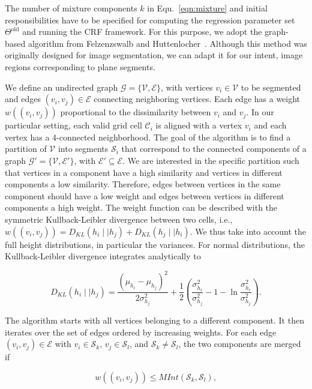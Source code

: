 The number of mixture components $k$ in Equ.~\eqref{eqn:mixture} and initial
responsibilities have to be specified for computing the regression parameter set
$\Theta^\text{old}$ and running the CRF framework. For this purpose, we adopt
the graph-based algorithm from Felzenzswalb and
Huttenlocher~\cite{felzenszwalb04efficient}. Although this method was originally
designed for image segmentation, we can adapt it for our intent, image regions
corresponding to plane segments.

We define an undirected graph $\mathcal{G}=\{\mathcal{V},\mathcal{E}\}$, with
vertices $v_i\in\mathcal{V}$ to be segmented and edges $(v_i,v_j)\in\mathcal{E}$
connecting neighboring vertices. Each edge has a weight $w((v_i,v_j))$
proportional to the dissimilarity between $v_i$ and $v_j$. In our particular
setting, each valid grid cell $\mathcal{C}_i$ is aligned with a vertex $v_i$ and
each vertex has a 4-connected neighborhood. The goal of the algorithm is to find
a partition of $\mathcal{V}$ into segments $\mathcal{S}_i$ that correspond to
the connected components of a graph $\mathcal{G}'=\{\mathcal{V},\mathcal{E}'\}$,
with $\mathcal{E}'\subseteq\mathcal{E}$. We are interested in the specific
partition such that vertices in a component have a high similarity and vertices
in different components a low similarity. Therefore, edges between vertices in
the same component should have a low weight and edges between vertices in
different components a high weight. The weight function can be described with
the symmetric Kullback-Leibler divergence between two cells, i.e.,
$w((v_i,v_j))=D_{KL}(h_i\mid\mid h_j)+D_{KL}(h_j\mid\mid h_i)$. We thus take
into account the full height distributions, in particular the variances. For
normal distributions, the Kullback-Leibler divergence integrates analytically to

\begin{equation}
\label{eqn:kl}
D_{KL}(h_i\mid\mid h_j)=\frac{(\mu_{h_i}-\mu_{h_j})^2}{2\sigma_{h_j}^2}+
\frac{1}{2}(\frac{\sigma_{h_i}^2}{\sigma_{h_j}^2}-1-\ln\frac{\sigma_{h_i}^2}
{\sigma_{h_j}^2}).
\end{equation}

The algorithm starts with all vertices belonging to a different component. It
then iterates over the set of edges ordered by increasing weights. For each
edge $(v_i,v_j)\in\mathcal{E}$ with $v_i\in\mathcal{S}_k$,
$v_j\in\mathcal{S}_l$, and $\mathcal{S}_k\neq\mathcal{S}_l$, the two components
are merged if

\begin{equation}
\label{eqn:merge}
w((v_i,v_j))\leq MInt(\mathcal{S}_k, \mathcal{S}_l),
\end{equation}


